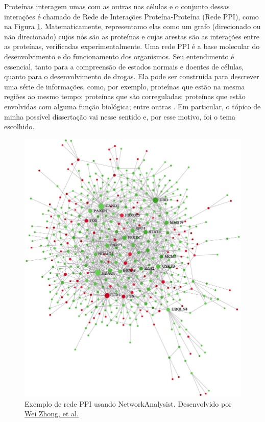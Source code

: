 \documentclass[11pt]{article}
\begin{document}
Proteínas interagem umas com as outras nas células e o conjunto dessas
interações é chamado de Rede de Interações Proteína-Proteína (Rede PPI), como
na Figura \ref{fig2:ppi}. 
Matematicamente, representamo elas como um grafo (direcionado ou não
direcionado) cujos nós são as proteínas e cujas arestas são as
interações entre as proteínas, verificadas experimentalmente. Uma rede
PPI é a base molecular do desenvolvimento e do funcionamento dos
organismos. Seu entendimento é essencial, tanto para a compreensão de
estados normais e doentes de células, quanto para o desenvolvimento de
drogas. Ela pode ser construída para descrever uma série de informações,
como, por exemplo, proteínas que estão na mesma regiões ao mesmo tempo;
proteínas que são correguladas; proteínas que estão envolvidas com
alguma função biológica; entre outras \cite{embl}. Em particular, o tópico
de minha possível dissertação vai nesse sentido e, por esse motivo, foi
o tema escolhido.

\begin{figure}
    \centering
    \includegraphics[width=\textwidth]{images/ppi-network.png}
    \caption{Exemplo de rede PPI usando NetworkAnalysist. Desenvolvido por \href{https://www.researchgate.net/figure/An-overview-of-the-PPI-network-The-PPI-network-was-generated-using-NetworkAnalyst-Red_fig5_323136513}{Wei
    Zhong, et al.}}
    \label{fig2:ppi}
\end{figure}
\end{document}
